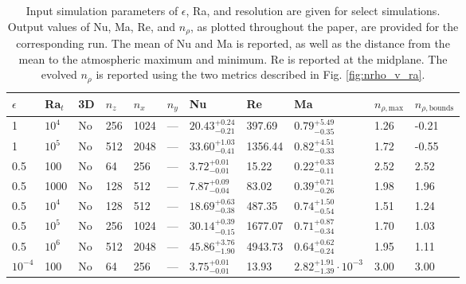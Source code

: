 \begin{table}
\begin{center}
\caption{Input simulation parameters of $\epsilon$, Ra, and resolution are given for
select simulations.
Output values of Nu, Ma, Re, and $n_\rho$, as plotted throughout the paper, are 
provided for the corresponding run.  The mean of Nu and Ma is reported, as well
as the distance from the mean to the atmospheric maximum and minimum.  Re is reported
at the midplane.  The evolved $n_\rho$ is reported using the two metrics described
in Fig. \ref{fig:nrho_v_ra}. \label{table:run_info}}
\begin{tabular}{ p{1cm} p{1cm} p{1cm} p{1cm} p{1cm} p{1cm} p{1.75cm} p{1.5cm} p{2.75cm} p{1cm} p{1.2cm}  }
\\
\hline
$\epsilon$	&	Ra$_t$	&	3D	&	$n_z$	&	$n_x$	&	$n_y$	&	Nu					&	Re	&	Ma					&	$n_{\rho, \text{max}}$	&	$n_{\rho, \text{bounds}}$	\\
\hline\hline
\vspace{0.08cm}1	&	$10^4$	&	No	&	256	&	1024	&	---	&$	20.43	_{-	0.21	}^{+	0.24	}$&	397.69	&$	0.79	_{-	0.35	}^{+	5.49	}$&	1.26	&	-0.21	\\
\vspace{0.08cm}1	&	$10^5$	&	No	&	512	&	2048	&	---	&$	33.60	_{-	0.41	}^{+	1.03	}$&	1356.44	&$	0.82	_{-	0.33	}^{+	4.51	}$&	1.72	&	-0.55	\\
\vspace{0.08cm}0.5	&	100	&	No	&	64	&	256	&	---	&$	3.72	_{-	0.01	}^{+	0.01	}$&	15.22	&$	0.22	_{-	0.11	}^{+	0.33	}$&	2.52	&	2.52	\\
\vspace{0.08cm}0.5	&	1000	&	No	&	128	&	512	&	---	&$	7.87	_{-	0.04	}^{+	0.09	}$&	83.02	&$	0.39	_{-	0.26	}^{+	0.71	}$&	1.98	&	1.96	\\
\vspace{0.08cm}0.5	&	$10^4$	&	No	&	128	&	512	&	---	&$	18.69	_{-	0.38	}^{+	0.63	}$&	487.35	&$	0.74	_{-	0.54	}^{+	1.50	}$&	1.51	&	1.24	\\
\vspace{0.08cm}0.5	&	$10^5$	&	No	&	256	&	1024	&	---	&$	30.14	_{-	0.15	}^{+	0.39	}$&	1677.07	&$	0.71	_{-	0.34	}^{+	0.87	}$&	1.70	&	1.03	\\
\vspace{0.08cm}0.5	&	$10^6$	&	No	&	512	&	2048	&	---	&$	45.86	_{-	1.90	}^{+	3.76	}$&	4943.73	&$	0.64	_{-	0.24	}^{+	0.62	}$&	1.95	&	1.11	\\
\vspace{0.08cm}$10^{-4}$	&	100	&	No	&	64	&	256	&	---	&$	3.75	_{-	0.01	}^{+	0.01	}$&	13.93	&$	2.82	_{-	1.39	}^{+	1.91}\cdot 10^{-3}	$&	3.00	&	3.00	\\

\end{tabular}
\end{center}
\end{table}
